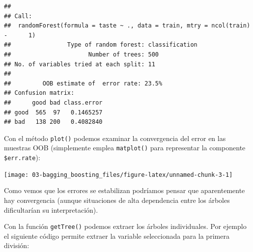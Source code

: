 \documentclass[
]{book}
\newenvironment{Shaded}{\begin{snugshade}}{\end{snugshade}}
\newcommand{\AttributeTok}[1]{\textcolor[rgb]{0.77,0.63,0.00}{#1}}
\newcommand{\CommentTok}[1]{\textcolor[rgb]{0.56,0.35,0.01}{\textit{#1}}}
\newcommand{\ConstantTok}[1]{\textcolor[rgb]{0.00,0.00,0.00}{#1}}
\newcommand{\ControlFlowTok}[1]{\textcolor[rgb]{0.13,0.29,0.53}{\textbf{#1}}}
\newcommand{\DecValTok}[1]{\textcolor[rgb]{0.00,0.00,0.81}{#1}}
\newcommand{\FunctionTok}[1]{\textcolor[rgb]{0.00,0.00,0.00}{#1}}
\newcommand{\NormalTok}[1]{#1}
\newcommand{\OtherTok}[1]{\textcolor[rgb]{0.56,0.35,0.01}{#1}}
\newcommand{\SpecialCharTok}[1]{\textcolor[rgb]{0.00,0.00,0.00}{#1}}
\newcommand{\StringTok}[1]{\textcolor[rgb]{0.31,0.60,0.02}{#1}}
\theoremstyle{break}
\theoremstyle{definition}
\theoremstyle{definition}
\theoremstyle{definition}
\theoremstyle{definition}
\theoremstyle{remark}
\begin{document}
\begin{verbatim}
## 
## Call:
##  randomForest(formula = taste ~ ., data = train, mtry = ncol(train) -      1) 
##                Type of random forest: classification
##                      Number of trees: 500
## No. of variables tried at each split: 11
## 
##         OOB estimate of  error rate: 23.5%
## Confusion matrix:
##      good bad class.error
## good  565  97   0.1465257
## bad   138 200   0.4082840
\end{verbatim}

Con el método \texttt{plot()} podemos examinar la convergencia del error en las muestras OOB (simplemente emplea \texttt{matplot()} para representar la componente \texttt{\$err.rate}):

\begin{Shaded}
\end{Shaded}

\begin{center}\texttt{[image: 03-bagging\_boosting\_files/figure-latex/unnamed-chunk-3-1]} \end{center}

Como vemos que los errores se estabilizan podríamos pensar que aparentemente hay convergencia (aunque situaciones de alta dependencia entre los árboles dificultarían su interpretación).

Con la función \texttt{getTree()} podemos extraer los árboles individuales.
Por ejemplo el siguiente código permite extraer la variable seleccionada para la primera división:

\begin{Shaded}
\end{Shaded}
\end{document}
